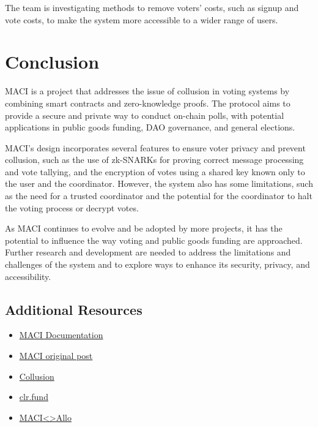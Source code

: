 \documentclass[11pt]{article}
\begin{document}
The team is investigating methods to remove voters' costs, such as signup and vote costs, to make the system more accessible to a wider range of users.
\section{Conclusion}
\label{sec:org2dd66a5}

MACI is a project that addresses the issue of collusion in voting systems by combining smart contracts and zero-knowledge proofs. The protocol aims to provide a secure and private way to conduct on-chain polls, with potential applications in public goods funding, DAO governance, and general elections.

MACI's design incorporates several features to ensure voter privacy and prevent collusion, such as the use of zk-SNARKs for proving correct message processing and vote tallying, and the encryption of votes using a shared key known only to the user and the coordinator. However, the system also has some limitations, such as the need for a trusted coordinator and the potential for the coordinator to halt the voting process or decrypt votes.

As MACI continues to evolve and be adopted by more projects, it has the potential to influence the way voting and public goods funding are approached. Further research and development are needed to address the limitations and challenges of the system and to explore ways to enhance its security, privacy, and accessibility.
\subsection{Additional Resources}
\label{sec:org170f7b3}

\begin{itemize}
\item \href{https://maci.pse.dev}{MACI Documentation}
\item \href{https://ethresear.ch/t/minimal-anti-collusion-infrastructure/5413}{MACI original post}
\item \href{https://vitalik.eth.limo/general/2019/04/03/collusion.html}{Collusion}
\item \href{https://clr.fund}{clr.fund}
\item \href{https://github.com/gitcoinco/MACI\_QF}{MACI<>Allo}
\end{itemize}
\end{document}

